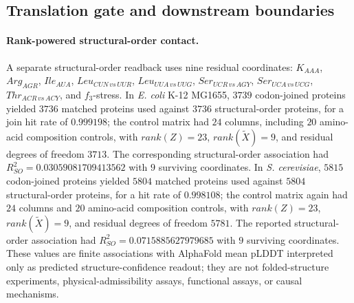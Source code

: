 \subsection{Translation gate and downstream boundaries}
\label{sec:biorality-q6-translation-gate-downstream-boundaries}

\paragraph{Rank-powered structural-order contact.}
A separate structural-order readback uses nine residual coordinates: $K_{AAA}$, $Arg_{AGR}$, $Ile_{AUA}$, $Leu_{CUN\,vs\,UUR}$, $Leu_{UUA\,vs\,UUG}$, $Ser_{UCR\,vs\,AGY}$, $Ser_{UCA\,vs\,UCG}$, $Thr_{ACR\,vs\,ACY}$, and $f_3$-stress.  In \emph{E. coli} K-12 MG1655, $3739$ codon-joined proteins yielded $3736$ matched proteins used against $3736$ structural-order proteins, for a join hit rate of $0.999198$; the control matrix had $24$ columns, including $20$ amino-acid composition controls, with $rank(Z)=23$, $rank(\widetilde X)=9$, and residual degrees of freedom $3713$.  The corresponding structural-order association had $R^2_{SO}=0.03059081709413562$ with $9$ surviving coordinates.  In \emph{S. cerevisiae}, $5815$ codon-joined proteins yielded $5804$ matched proteins used against $5804$ structural-order proteins, for a hit rate of $0.998108$; the control matrix again had $24$ columns and $20$ amino-acid composition controls, with $rank(Z)=23$, $rank(\widetilde X)=9$, and residual degrees of freedom $5781$.  The reported structural-order association had $R^2_{SO}=0.0715885627979685$ with $9$ surviving coordinates.  These values are finite associations with AlphaFold mean pLDDT interpreted only as predicted structure-confidence readout; they are not folded-structure experiments, physical-admissibility assays, functional assays, or causal mechanisms.

